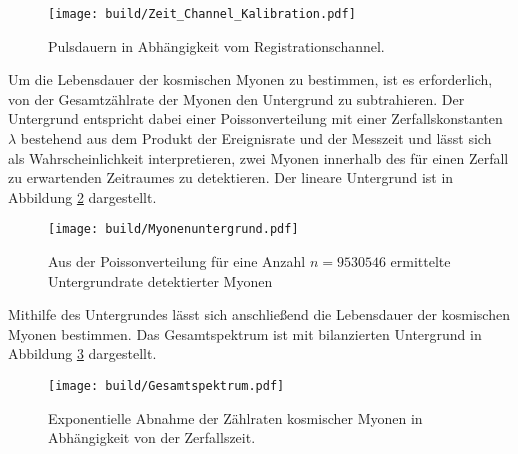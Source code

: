 \FloatBarrier
\begin{figure}
  \centering
  \texttt{[image: build/Zeit\_Channel\_Kalibration.pdf]}
  \caption{Pulsdauern in Abhängigkeit vom Registrationschannel.}
  \label{fig:06}
\end{figure}
\FloatBarrier
\noindent Um die Lebensdauer der kosmischen Myonen zu bestimmen, ist es
erforderlich, von der Gesamtzählrate der Myonen den Untergrund zu subtrahieren.
Der Untergrund entspricht dabei einer Poissonverteilung mit einer
Zerfallskonstanten $\lambda$ bestehend aus dem Produkt der Ereignisrate und der
Messzeit und lässt sich als Wahrscheinlichkeit interpretieren, zwei Myonen
innerhalb des für einen Zerfall zu erwartenden Zeitraumes zu detektieren. Der
lineare Untergrund ist in Abbildung \ref{fig:07} dargestellt.  \\
\FloatBarrier
\begin{figure}
  \centering
  \texttt{[image: build/Myonenuntergrund.pdf]}
  \caption{Aus der Poissonverteilung für eine Anzahl $n = 9530546$ ermittelte
  Untergrundrate detektierter Myonen}
  \label{fig:07}
\end{figure}
\FloatBarrier
\noindent Mithilfe des Untergrundes lässt sich anschließend die Lebensdauer der
kosmischen Myonen bestimmen. Das Gesamtspektrum ist mit bilanzierten Untergrund
in Abbildung \ref{fig:08} dargestellt. \\
\FloatBarrier
\begin{figure}
  \centering
  \texttt{[image: build/Gesamtspektrum.pdf]}
  \caption{Exponentielle Abnahme der Zählraten kosmischer Myonen in Abhängigkeit
  von der Zerfallszeit.}
  \label{fig:08}
\end{figure}
\FloatBarrier
